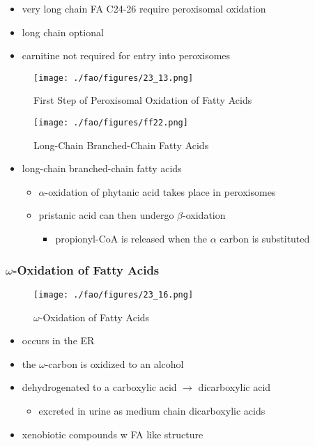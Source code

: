 \documentclass{scrartcl}
\begin{document}
\begin{itemize}
\item very long chain FA C24-26 require peroxisomal oxidation
\item long chain optional
\item carnitine not required for entry into peroxisomes
\end{itemize}

\begin{figure}[htbp]
\centering
\texttt{[image: ./fao/figures/23\_13.png]}
\caption{\label{fig:orgd067f14}
First Step of Peroxisomal Oxidation of Fatty Acids}
\end{figure}

\begin{figure}[htbp]
\centering
\texttt{[image: ./fao/figures/ff22.png]}
\caption{\label{fig:org5d1d9db}
Long-Chain Branched-Chain Fatty Acids}
\end{figure}

\begin{itemize}
\item long-chain branched-chain fatty acids
\begin{itemize}
\item \(\alpha\)-oxidation of phytanic acid takes place in peroxisomes
\item pristanic acid can then undergo \(\beta\)-oxidation
\begin{itemize}
\item propionyl-CoA is released when the \(\alpha\) carbon is substituted
\end{itemize}
\end{itemize}
\end{itemize}

\subsubsection{\(\omega\)-Oxidation of Fatty Acids}
\label{sec:org00c9687}

\begin{figure}[htbp]
\centering
\texttt{[image: ./fao/figures/23\_16.png]}
\caption{\label{fig:org4a015e5}
\(\omega\)-Oxidation of Fatty Acids}
\end{figure}

\begin{itemize}
\item occurs in the ER
\item the \(\omega\)-carbon is oxidized to an alcohol
\item dehydrogenated to a carboxylic acid \(\to\) dicarboxylic acid
\begin{itemize}
\item excreted in urine as medium chain dicarboxylic acids
\end{itemize}
\item xenobiotic compounds w FA like structure
\end{itemize}
\end{document}

